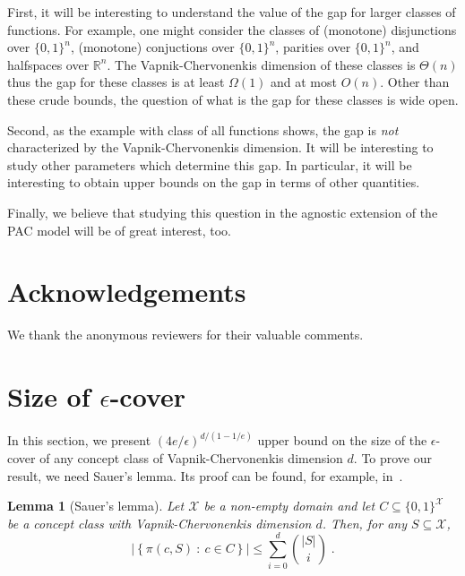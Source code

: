 \documentclass[11pt]{article}
\newtheorem{lemma}[proposition]{Lemma}
\newcommand{\R}{\mathbb{R}}
\newcommand{\X}{\mathcal{X}}
\begin{document}
First, it will be interesting to understand the value of the gap for larger
classes of functions. For example, one might consider the classes of (monotone)
disjunctions over $\{0,1\}^n$, (monotone) conjuctions over $\{0,1\}^n$, parities
over $\{0,1\}^n$, and halfspaces over $\R^n$. The Vapnik-Chervonenkis dimension
of these classes is $\Theta(n)$ thus the gap for these classes is at least
$\Omega(1)$ and at most $O(n)$. Other than these crude bounds, the question of
what is the gap for these classes is wide open.

Second, as the example with class of all functions shows, the gap is \emph{not}
characterized by the Vapnik-Chervonenkis dimension. It will be interesting to
study other parameters which determine this gap. In particular, it will be
interesting to obtain upper bounds on the gap in terms of other quantities.

Finally, we believe that studying this question in the agnostic extension of the
PAC model \citep[Chapter~2]{Anthony-Bartlett-1999} will be of great interest,
too.

\section*{Acknowledgements}
We thank the anonymous reviewers for their valuable comments.




\appendix
\section{Size of $\epsilon$-cover}
\label{section:epsilon-cover}

In this section, we present $(4e/\epsilon)^{d/(1 - 1/e)}$ upper bound on the
size of the $\epsilon$-cover of any concept class of Vapnik-Chervonenkis
dimension $d$. To prove our result, we need Sauer's lemma. Its proof can be
found, for example, in~\citet[Chapter 3]{Anthony-Bartlett-1999}.

\begin{lemma}[Sauer's lemma]
Let $\X$ be a non-empty domain and let $C \subseteq \{0,1\}^\X$ be a concept class
with Vapnik-Chervonenkis dimension $d$. Then, for any $S \subseteq \X$,
$$
\left| \left\{ \pi(c, S) ~:~ c \in C \right\} \right| \le \sum_{i=0}^d \binom{|S|}{i} \; .
$$
\end{lemma}
\end{document}
